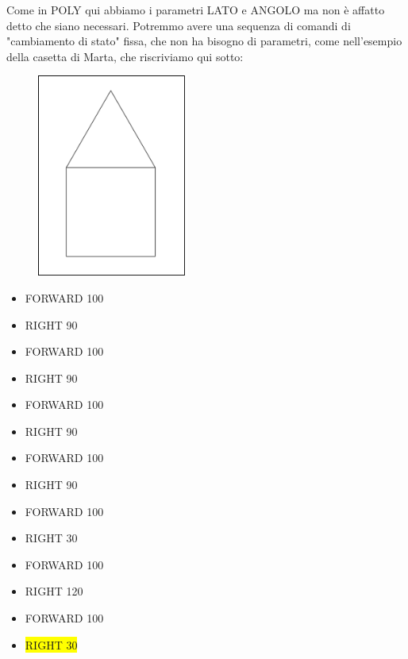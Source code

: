 Come in POLY qui abbiamo i parametri LATO e ANGOLO ma non è affatto detto che siano necessari. Potremmo avere una sequenza di comandi di "cambiamento di stato" fissa, che non ha bisogno di parametri, come nell'esempio della casetta di Marta, che riscriviamo qui sotto:

\begin{minipage}{0.5\textwidth}
\begin{figure}[H]
   \includegraphics[width=5.0cm,trim=4 4 6 4,clip]{./images/marta/mar-1.png}
   \label{mar-17}
\end{figure}
\end{minipage} \hfill
\begin{minipage}{0.45\textwidth}
\begin{itemize}[itemsep=-3pt,parsep=2pt]
\item[] \hspace{0.5cm} FORWARD 100
\item[] \hspace{0.5cm} RIGHT 90
\item[] \hspace{0.5cm} FORWARD 100
\item[] \hspace{0.5cm} RIGHT 90
\item[] \hspace{0.5cm} FORWARD 100
\item[] \hspace{0.5cm} RIGHT 90
\item[] \hspace{0.5cm} FORWARD 100
\item[] \hspace{0.5cm} RIGHT 90
\item[] \hspace{0.5cm} FORWARD 100
\item[] \hspace{0.5cm} RIGHT 30
\item[] \hspace{0.5cm} FORWARD 100
\item[] \hspace{0.5cm} RIGHT 120
\item[] \hspace{0.5cm} FORWARD 100
\item[] \hspace{0.4cm} \colorbox{yellow}{RIGHT 30}
\end{itemize}
\end{minipage}


